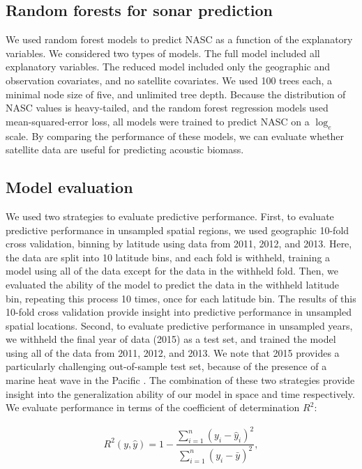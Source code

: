 \documentclass[10pt,letterpaper]{article}
\begin{document}
\subsection*{Random forests for sonar prediction}

We used random forest models to predict NASC as a function of the explanatory variables.
We considered two types of models.
The full model included all explanatory variables.
The reduced model included only the geographic and observation covariates, and no satellite covariates.
We used 100 trees each, a minimal node size of five, and unlimited tree depth.
Because the distribution of NASC values is heavy-tailed, and the random forest regression models used mean-squared-error loss, all models were trained to predict NASC on a $\log_e$ scale.
By comparing the performance of these models, we can evaluate whether satellite data are useful for predicting acoustic biomass.

\subsection*{Model evaluation}

We used two strategies to evaluate predictive performance.
First, to evaluate predictive performance in unsampled spatial regions, we used geographic 10-fold cross validation, binning by latitude using data from 2011, 2012, and 2013.
Here, the data are split into 10 latitude bins, and each fold is withheld, training a model using all of the data except for the data in the withheld fold.
Then, we evaluated the ability of the model to predict the data in the withheld latitude bin, repeating this process 10 times, once for each latitude bin.
The results of this 10-fold cross validation provide insight into predictive performance in unsampled spatial locations.
Second, to evaluate predictive performance in unsampled years, we withheld the final year of data (2015) as a test set, and trained the model using all of the data from 2011, 2012, and 2013.
We note that 2015 provides a particularly challenging out-of-sample test set, because of the presence of a marine heat wave in the Pacific \cite{di2016multi}.
The combination of these two strategies provide insight into the generalization ability of our model in space and time respectively.
We evaluate performance in terms of the coefficient of determination $R^2$:

\begin{gather*}
R^2(y, \hat{y}) = 1 - \dfrac{\sum_{i = 1}^n (y_i - \hat{y}_i)^2}{\sum_{i = 1}^n (y_i - \bar{y})^2},
\end{gather*}
\end{document}
